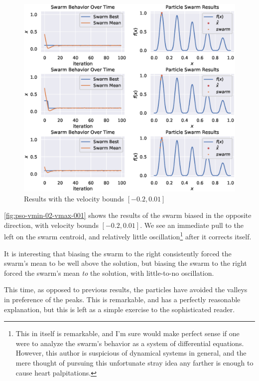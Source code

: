 \documentclass[12pt]{article}
\begin{document}
\begin{figure}[H]
    \centering
    \includegraphics[width=\textwidth]{figures/pso-v20-v001.eps}
    \caption{Results with the velocity bounds $[-0.2, 0.01]$}\label{fig:pso-vmin-02-vmax-001}
\end{figure}

\autoref{fig:pso-vmin-02-vmax-001} shows the results of the swarm biased in the opposite direction, with velocity bounds $[-0.2, 0.01]$.
We see an immediate pull to the left on the swarm centroid, and relatively little oscillation\footnote{This in itself is remarkable, and I'm sure would make perfect sense if one were to analyze the swarm's behavior as a system of differential equations. However, this author is suspicious of dynamical systems in general, and the mere thought of pursuing this unfortunate stray idea any farther is enough to cause heart palpitations.} after it corrects itself.

It is interesting that biasing the swarm to the right consistently forced the swarm's mean to be well above the solution, but biasing the swarm to the right forced the swarm's mean \textit{to} the solution, with little-to-no oscillation.

This time, as opposed to previous results, the particles have avoided the valleys in preference of the peaks.
This is remarkable, and has a perfectly reasonable explanation, but this is left as a simple exercise to the sophisticated reader.
\end{document}
